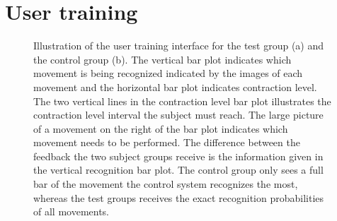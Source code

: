 
\section{User training}

\begin{figure}[H] 
	\centering
	\caption{Illustration of the user training interface for the test group (a) and the control group (b). The vertical bar plot indicates which movement is being recognized indicated by the images of each movement and the horizontal bar plot indicates contraction level. The two vertical lines in the contraction level bar plot illustrates the contraction level interval the subject must reach. The large picture of a movement on the right of the bar plot indicates which movement needs to be performed. The difference between the feedback the two subject groups receive is the information given in the vertical recognition bar plot. The control group only sees a full bar of the movement the control system recognizes the most, whereas the test groups receives the exact recognition probabilities of all movements.}
	\label{fig:feedbackGUI}
\end{figure}